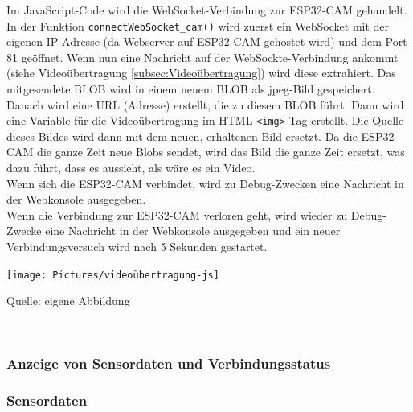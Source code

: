 \documentclass[ngerman,12pt,a4paper]{article}
\begin{document}
	Im JavaScript-Code wird die WebSocket-Verbindung zur ESP32-CAM gehandelt. In der Funktion \texttt{connectWebSocket\_cam()} wird zuerst ein WebSocket mit der eigenen IP-Adresse (da Webserver auf ESP32-CAM gehostet wird) und dem Port 81 geöffnet. Wenn nun eine Nachricht auf der WebSockte-Verbindung ankommt (siehe Videoübertragung \ref{subsec:Videoübertragung}) wird diese extrahiert. Das mitgesendete BLOB wird in einem neuem BLOB als jpeg-Bild gespeichert. Danach wird eine URL (Adresse) erstellt, die zu diesem BLOB führt. Dann wird eine Variable für die Videoübertragung im HTML \texttt{<img>}-Tag erstellt. Die Quelle dieses Bildes wird dann mit dem neuen, erhaltenen Bild ersetzt. Da die ESP32-CAM die ganze Zeit neue Blobs sendet, wird das Bild die ganze Zeit ersetzt, was dazu führt, dass es aussieht, als wäre es ein Video. \\[0.5cm]
	Wenn sich die ESP32-CAM verbindet, wird zu Debug-Zwecken eine Nachricht in der Webkonsole ausgegeben. \\[0.5cm]
	Wenn die Verbindung zur ESP32-CAM verloren geht, wird wieder zu Debug-Zwecke eine Nachricht in der Webkonsole ausgegeben und ein neuer Verbindungsversuch wird nach 5 Sekunden gestartet. \\[0.5cm]
	\begin{center}
		\begin{minipage}[t]{\textwidth}
			\texttt{[image: Pictures/videoübertragung-js]}
			\label{fig:videoübertragung-js}
			\vspace{-10pt}
			\begin{center}
				\par\small Quelle: eigene Abbildung 
			\end{center}
		\end{minipage} \\[0.75cm]
	\end{center}
	
	
			
			\subsubsection{Anzeige von Sensordaten und Verbindungsstatus}
			
				\subsubsection*{Sensordaten}	
			
\end{document}
